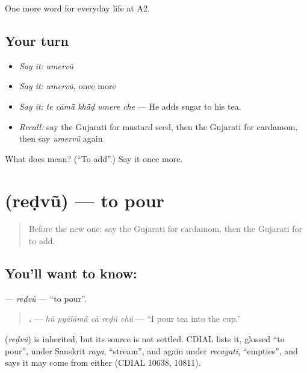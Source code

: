 \begin{grammarlens}[title={What you've built}]
One more word for everyday life at A2.
\end{grammarlens}

\subsection*{Your turn}
\begin{itemize}
\raggedright
  \item \emph{Say it:} \emph{umervũ}
  \item \emph{Say it:} \emph{umervũ}, once more
  \item \emph{Say it:} \emph{te cāmā̃ khā̃ḍ umere che} — He adds sugar to his tea.
  \item \emph{Recall:} say the Gujarati for mustard seed, then the Gujarati for cardamom, then say \emph{umervũ} again
\end{itemize}

\begin{tcolorbox}[breakable,colback=teal!4,colframe=teal!35!black,title={Before you move on}]
What does  mean? (\textquotedblleft{}To add\textquotedblright{}.) Say it once more.
\end{tcolorbox}
\section[\texorpdfstring{\gu{રેડવું} (reḍvũ)}{રેડવું (reḍvũ)}]{ (reḍvũ) — to pour}

\label{lesson:GU-C165-redvu}



\begin{quote}
Before the new one: say the Gujarati for cardamom, then the Gujarati for to add.
\end{quote}

\subsection*{You'll want to know: }
\textbf{} — \emph{reḍvũ} — \textquotedblleft{}to pour\textquotedblright{}.

\begin{quote}
\textbf{    .} — \emph{hũ pyālāmā̃ cā reḍũ chũ} — \textquotedblleft{}I pour tea into the cup.\textquotedblright{}
\end{quote}

\begin{cousinweb}
\textbf{} (\emph{reḍvũ}) is inherited, but its source is not settled. CDIAL lists it, glossed \textquotedblleft{}to pour\textquotedblright{}, under Sanskrit \emph{raya}, \textquotedblleft{}stream\textquotedblright{}, and again under \emph{recayati}, \textquotedblleft{}empties\textquotedblright{}, and says it may come from either (CDIAL 10638, 10811).
\end{cousinweb}

